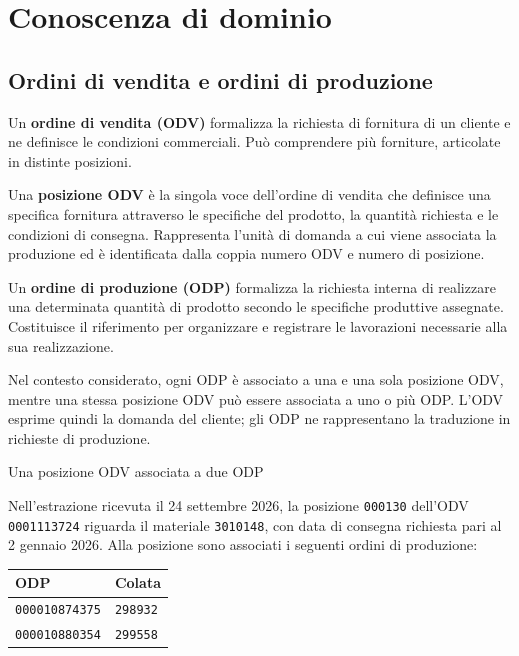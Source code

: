 \section{Conoscenza di dominio}
\label{sec:domain-knowledge}

\subsection{Ordini di vendita e ordini di produzione}
\label{sec:odv-odp}

Un \textbf{ordine di vendita (ODV)} formalizza la richiesta di fornitura di un cliente e ne definisce le condizioni commerciali. Può comprendere più forniture, articolate in distinte posizioni.

Una \textbf{posizione ODV} è la singola voce dell'ordine di vendita che definisce una specifica fornitura attraverso le specifiche del prodotto, la quantità richiesta e le condizioni di consegna. Rappresenta l'unità di domanda a cui viene associata la produzione ed è identificata dalla coppia numero ODV e numero di posizione.

Un \textbf{ordine di produzione (ODP)} formalizza la richiesta interna di realizzare una determinata quantità di prodotto secondo le specifiche produttive assegnate. Costituisce il riferimento per organizzare e registrare le lavorazioni necessarie alla sua realizzazione.

Nel contesto considerato, ogni ODP è associato a una e una sola posizione ODV, mentre una stessa posizione ODV può essere associata a uno o più ODP. L'ODV esprime quindi la domanda del cliente; gli ODP ne rappresentano la traduzione in richieste di produzione.

\begin{examplebox}{Una posizione ODV associata a due ODP}

Nell'estrazione ricevuta il 24 settembre 2026, la posizione \texttt{000130} dell'ODV \texttt{0001113724} riguarda il materiale \texttt{3010148}, con data di consegna richiesta pari al 2 gennaio 2026. Alla posizione sono associati i seguenti ordini di produzione:

\begin{center}
\begin{tabular}{ll}
\toprule
\textbf{ODP} & \textbf{Colata} \\
\midrule
\texttt{000010874375} & \texttt{298932} \\
\texttt{000010880354} & \texttt{299558} \\
\bottomrule
\end{tabular}
\end{center}

\end{examplebox}

